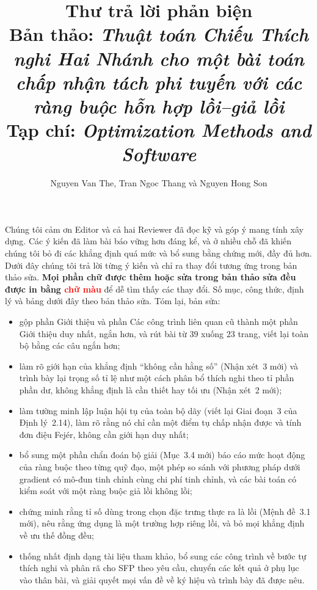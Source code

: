 \documentclass[11pt]{article}
\title{\vspace{-2em}Thư trả lời phản biện\\[0.3em]
\large Bản thảo: \emph{Thuật toán Chiếu Thích nghi Hai Nhánh cho một bài toán chấp nhận tách phi tuyến với các ràng buộc hỗn hợp lồi--giả lồi}\\[0.2em]
\normalsize Tạp chí: \emph{Optimization Methods and Software}}
\author{Nguyen Van The, Tran Ngoc Thang và Nguyen Hong Son}
\date{}
\begin{document}
\maketitle
\vspace{-2em}

\begin{center}
\end{center}

\noindent Chúng tôi cảm ơn Editor và cả hai Reviewer đã đọc kỹ và góp ý mang tính xây dựng.
Các ý kiến đã làm bài báo vững hơn đáng kể, và ở nhiều chỗ đã khiến
chúng tôi bỏ đi các khẳng định quá mức và bổ sung bằng chứng mới, đầy đủ hơn. Dưới đây chúng tôi trả lời
từng ý kiến và chỉ ra thay đổi tương ứng trong bản thảo sửa.
\textbf{Mọi phần chữ được thêm hoặc sửa trong bản thảo sửa đều được in bằng
\textcolor{red}{chữ màu}} để dễ tìm thấy các thay đổi. Số mục, công thức,
định lý và bảng dưới đây theo bản thảo sửa. Tóm lại, bản sửa:
\begin{itemize}[nosep]
  \item gộp phần Giới thiệu và phần Các công trình liên quan cũ thành một phần Giới thiệu
        duy nhất, ngắn hơn, và rút bài từ $39$ xuống $23$ trang, viết lại toàn bộ
        bằng các câu ngắn hơn;
  \item làm rõ giới hạn của khẳng định ``không cần hằng số'' (Nhận xét~3 mới) và trình bày lại trọng số tỉ lệ
        như một cách phân bổ thích nghi theo tỉ phần phần dư, không khẳng định là cần thiết hay
        tối ưu (Nhận xét~2 mới);
  \item làm tường minh lập luận hội tụ của toàn bộ dãy (viết lại Giai đoạn~3 của
        Định lý~2.14), làm rõ rằng nó chỉ cần một điểm tụ chấp nhận được và
        tính đơn điệu Fej\'er, không cần giới hạn duy nhất;
  \item bổ sung một phần chẩn đoán bộ giải (Mục~3.4 mới) báo cáo mức hoạt động của ràng buộc
        theo từng quỹ đạo, một phép so sánh với phương pháp dưới gradient có mô-đun tinh chỉnh cùng chi phí tinh chỉnh, và
        các bài toán có kiểm soát với một ràng buộc giả lồi không lồi;
  \item chứng minh rằng tỉ số dùng trong chọn đặc trưng thực ra là lồi (Mệnh đề~3.1 mới),
        nêu rằng ứng dụng là một trường hợp riêng lồi, và bỏ mọi
        khẳng định về ưu thế đồng đều;
  \item thống nhất định dạng tài liệu tham khảo, bổ sung các công trình về bước tự thích nghi và phân rã
        cho SFP theo yêu cầu, chuyển các kết quả ở phụ lục vào thân bài, và giải quyết
        mọi vấn đề về ký hiệu và trình bày đã được nêu.
\end{itemize}
\end{document}
